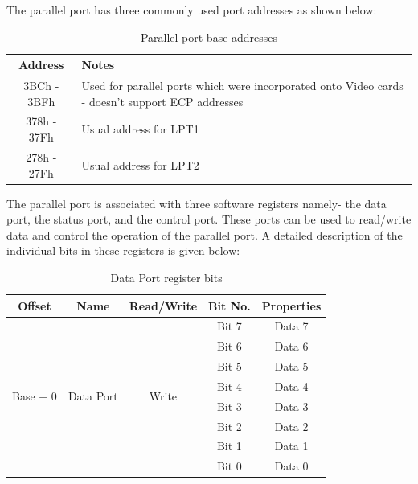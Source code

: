 \documentclass[a4paper,28pt]{report}
\begin{document}
The parallel port has three commonly used port addresses as shown below:

\newpage
\begin{table}[h]
\centering
\bgroup
\def\arraystretch{1.5}
\begin{tabular}{ |c|p{7cm}| }
\hline
\textbf{Address} & \textbf{Notes}\\
\hline
3BCh - 3BFh & Used for parallel ports which were incorporated onto Video cards - doesn't support ECP addresses\\
\hline
378h - 37Fh & Usual address for LPT1\\
\hline
278h - 27Fh & Usual address for LPT2\\
\hline
\end{tabular}
\caption{Parallel port base addresses}
\egroup
\end{table}

The parallel port is associated with three software registers namely- the data port, the status port, and the control port.
These ports can be used to read/write data and control the operation of the parallel port. A detailed description of the individual bits in these registers is given below:

\begin{table}[h]
\centering
\bgroup
\def\arraystretch{1.5}
\begin{tabular}{|c|c|c|c|c|}
\hline
\textbf{Offset}           & \textbf{Name}              & \textbf{Read/Write}    & \textbf{Bit No.} & \textbf{Properties} \\ \hline
\multirow{8}{*}{Base + 0} & \multirow{8}{*}{Data Port} & \multirow{8}{*}{Write} & Bit 7            & Data 7              \\ \cline{4-5} 
                          &                            &                        & Bit 6            & Data 6              \\ \cline{4-5} 
                          &                            &                        & Bit 5            & Data 5              \\ \cline{4-5} 
                          &                            &                        & Bit 4            & Data 4              \\ \cline{4-5} 
                          &                            &                        & Bit 3            & Data 3              \\ \cline{4-5} 
                          &                            &                        & Bit 2            & Data 2              \\ \cline{4-5} 
                          &                            &                        & Bit 1            & Data 1              \\ \cline{4-5} 
                          &                            &                        & Bit 0            & Data 0              \\ \hline
\end{tabular}
\caption{Data Port register bits}
\egroup
\end{table}
\end{document}

